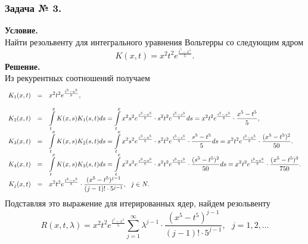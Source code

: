 \subsubsection*{\center Задача № 3.}
{\bf Условие.~}\\
Найти резольвенту для интегрального уравнения Вольтерры со следующим ядром 
$$K(x,t)=x^2t^2e^\frac{t^5-x^5}{5}.$$
\noindent
{\bf Решение.~}\\
\noindent
Из рекурентных соотношений получаем
$$
\begin{array}{rcl}
K_1(x,t)&=&\displaystyle x^2t^2e^\frac{t^5-x^5}{5}, \\[12pt]
K_2(x,t)&=&\displaystyle\int\limits_t^x K(x,s)K_1(s,t)ds =\int\limits_t^x\displaystyle x^2s^2e^\frac{s^5-x^5}{5} \cdot s^2t^2e^\frac{t^5-s^5}{5}ds = x^2t^2e^{\frac{t^5-x^5}{5}}\cdot{{x^5-t^5}\over{5}},\\[12pt]
K_3(x,t)&=&\displaystyle\int\limits_t^x K(x,s)K_2(s,t)ds = \int\limits_t^x \displaystyle x^2s^2e^\frac{s^5-x^5}{5}\cdot s^2t^2e^{\frac{t^5-s^5}{5}}\cdot{{s^5-t^5}\over{5}} ds = x^2t^2e^{\frac{t^5-x^5}{5}}\cdot\frac{(x^5-t^5)^2}{50}.\\[12pt]
K_4(x,t)&=&\displaystyle\int\limits_t^x K(x,s)K_3(s,t)ds = \int\limits_t^x \displaystyle x^2s^2e^\frac{s^5-x^5}{5}\cdot s^2t^2e^{\frac{t^5-s^5}{5}}\cdot{({s^5-t^5})^2\over{50}} ds = x^2t^2e^{\frac{t^5-x^5}{5}}\cdot\frac{(x^5-t^5)^3}{750}.\\[12pt]
K_j(x,t)&=&\displaystyle x^2t^2e^{\frac{t^5-x^5}{5}} \cdot\displaystyle\frac{(x^5-t^5)^{j-1}}{(j-1)!\cdot5^{j-1}}, \ \ 
j\in{N}.
\end{array}
$$
Подставляя это выражение для итерированных ядер, найдем резольвенту
$$ 
R(x,t,\lambda)=\displaystyle x^2t^2e^{\frac{t^5-x^5}{5}}\sum_{j=1}^\infty \lambda^{j-1}\cdot\displaystyle\frac{(x^5-t^5)^{j-1}}{(j-1)!\cdot5^{j-1}}, \ \ \ 
j=1,2,\ldots
$$
